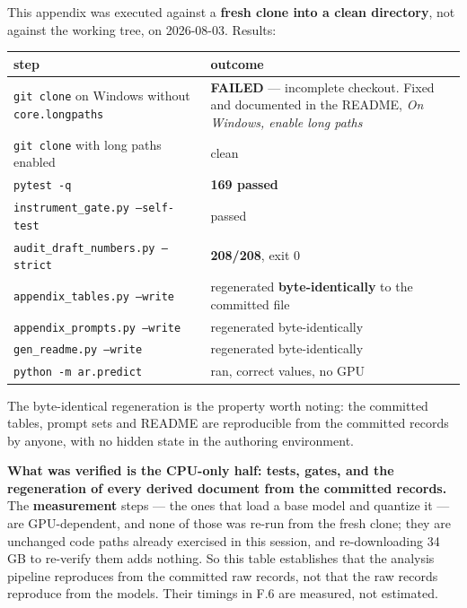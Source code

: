 This appendix was executed against a \textbf{fresh clone into a clean directory}, not against the working tree, on 2026-08-03. Results:

\begin{table}[t]
\centering\scriptsize
\begin{tabularx}{\textwidth}{>{\hsize=0.623\hsize\raggedright\arraybackslash}X>{\hsize=1.377\hsize\raggedright\arraybackslash}X}
\toprule
step & outcome \\
\midrule
\texttt{git clone} on Windows without \texttt{core.\allowbreak{}longpaths} & \textbf{FAILED} --- incomplete checkout. Fixed and documented in the README, \emph{On Windows, enable long paths} \\
\texttt{git clone} with long paths enabled & clean \\
\texttt{pytest -\allowbreak{}q} & \textbf{169 passed} \\
\texttt{instrument\_\allowbreak{}gate.\allowbreak{}py --\allowbreak{}self-\allowbreak{}test} & passed \\
\texttt{audit\_\allowbreak{}draft\_\allowbreak{}numbers.\allowbreak{}py --\allowbreak{}strict} & \textbf{208/208}, exit 0 \\
\texttt{appendix\_\allowbreak{}tables.\allowbreak{}py --\allowbreak{}write} & regenerated \textbf{byte-identically} to the committed file \\
\texttt{appendix\_\allowbreak{}prompts.\allowbreak{}py --\allowbreak{}write} & regenerated byte-identically \\
\texttt{gen\_\allowbreak{}readme.\allowbreak{}py --\allowbreak{}write} & regenerated byte-identically \\
\texttt{python -\allowbreak{}m ar.\allowbreak{}predict} & ran, correct values, no GPU \\
\bottomrule
\end{tabularx}
\end{table}

The byte-identical regeneration is the property worth noting: the committed tables, prompt sets and README are reproducible from the committed records by anyone, with no hidden state in the authoring environment.

\textbf{What was verified is the CPU-only half: tests, gates, and the regeneration of every derived document from the committed records.} The \textbf{measurement} steps --- the ones that load a base model and quantize it --- are GPU-dependent, and none of those was re-run from the fresh clone; they are unchanged code paths already exercised in this session, and re-downloading 34 GB to re-verify them adds nothing. So this table establishes that the analysis pipeline reproduces from the committed raw records, not that the raw records reproduce from the models. Their timings in F.6 are measured, not estimated.

